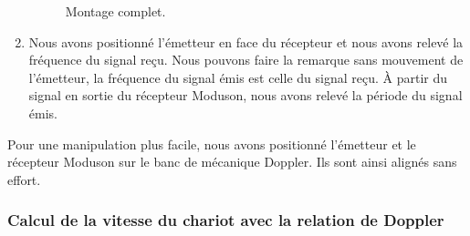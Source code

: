 \documentclass[a4paper]{article}
\begin{document}
\begin{enumerate}
\begin{figure}[H]
    \caption{Montage complet.}
    \label{fig:montageComplet}
  \end{figure}
  \item Nous avons positionné l’émetteur en face du récepteur et nous avons relevé la fréquence du signal reçu. Nous pouvons faire la remarque sans mouvement de l’émetteur, la fréquence du signal émis est celle du signal reçu. À partir du signal en sortie du récepteur Moduson, nous avons relevé la période du signal émis.
\end{enumerate}
Pour une manipulation plus facile, nous avons positionné l’émetteur et le récepteur Moduson sur le banc de mécanique Doppler. Ils sont ainsi alignés sans effort.










\subsubsection{Calcul de la vitesse du chariot avec la relation de Doppler}
\end{document}
